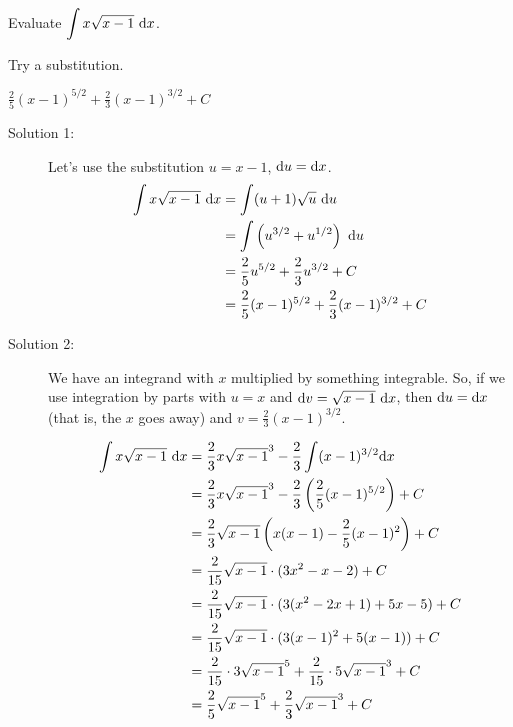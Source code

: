 \begin{question}
Evaluate $\displaystyle\int x\sqrt{x-1}~\mathrm{d}x$.
\end{question}
\begin{hint}
Try a substitution.
\end{hint}
\begin{answer}
$\displaystyle\frac{2}{5}(x-1)^{5/2} + \frac{2}{3}(x-1)^{3/2}+C$
\end{answer}
\begin{solution}
\begin{description}
\item[Solution 1:]
Let's use the substitution $u=x-1$, $\mathrm{d}u=\mathrm{d}x$.
\begin{align*}
\int x\sqrt{x-1}~\mathrm{d}x&=\int(u+1)\sqrt{u}~\mathrm{d}u\\
&=\int \left(u^{3/2}+u^{1/2}\right)~\mathrm{d}u\\
&=\frac{2}{5}u^{5/2} + \frac{2}{3}u^{3/2}+C\\
&=\frac{2}{5}(x-1)^{5/2} + \frac{2}{3}(x-1)^{3/2}+C
\end{align*}
\item[Solution 2:]
We have an integrand with $x$ multiplied by something integrable. So, if we use integration by parts with $u=x$ and $\mathrm{d}v = \sqrt{x-1}~\mathrm{d}x$, then $\mathrm{d}u=\mathrm{d}x$ (that is, the $x$ goes away) and $v = \frac{2}{3}(x-1)^{3/2}$.

\begin{align*}
\int x\sqrt{x-1}~\mathrm{d}x&=\frac{2}{3}x\sqrt{x-1}^3 - \frac{2}{3}\int(x-1)^{3/2}\mathrm{d}x \\
&= \frac{2}{3}x\sqrt{x-1}^3 - \frac{2}{3}\left(\frac{2}{5}(x-1)^{5/2}\right)+C\\
&=\frac{2}{3}\sqrt{x-1}\left(x(x-1)-\frac{2}{5}(x-1)^2\right)+C\\
&=\frac{2}{15}\sqrt{x-1}\cdot(3x^2-x-2)+C\\
&=\frac{2}{15}\sqrt{x-1}\cdot(3(x^2-2x+1)+5x-5)+C\\
&=\frac{2}{15}\sqrt{x-1}\cdot(3(x-1)^2+5(x-1))+C\\
&=\frac{2}{15}\cdot 3\sqrt{x-1}^5 +\frac{2}{15}\cdot 5\sqrt{x-1}^3+C\\
&=\frac{2}{5}\sqrt{x-1}^5 +\frac{2}{3}\sqrt{x-1}^3+C
\end{align*}
\end{description}
\end{solution}







